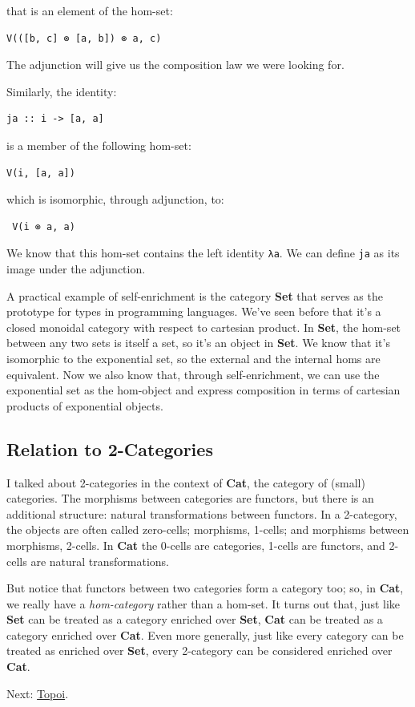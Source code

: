 that is an element of the hom-set:

\begin{verbatim}
V(([b, c] ⊗ [a, b]) ⊗ a, c)
\end{verbatim}

The adjunction will give us the composition law we were looking for.

Similarly, the identity:

\begin{verbatim}
ja :: i -> [a, a]
\end{verbatim}

is a member of the following hom-set:

\begin{verbatim}
V(i, [a, a])
\end{verbatim}

which is isomorphic, through adjunction, to:

\begin{verbatim}
 V(i ⊗ a, a)
\end{verbatim}

We know that this hom-set contains the left identity \texttt{λa}. We can
define \texttt{ja} as its image under the adjunction.

A practical example of self-enrichment is the category \textbf{Set} that
serves as the prototype for types in programming languages. We've seen
before that it's a closed monoidal category with respect to cartesian
product. In \textbf{Set}, the hom-set between any two sets is itself a
set, so it's an object in \textbf{Set}. We know that it's isomorphic to
the exponential set, so the external and the internal homs are
equivalent. Now we also know that, through self-enrichment, we can use
the exponential set as the hom-object and express composition in terms
of cartesian products of exponential objects.

\subsection{Relation to 2-Categories}\label{relation-to-2-categories}

I talked about 2-categories in the context of \textbf{Cat}, the category
of (small) categories. The morphisms between categories are functors,
but there is an additional structure: natural transformations between
functors. In a 2-category, the objects are often called zero-cells;
morphisms, 1-cells; and morphisms between morphisms, 2-cells. In
\textbf{Cat} the 0-cells are categories, 1-cells are functors, and
2-cells are natural transformations.

But notice that functors between two categories form a category too; so,
in \textbf{Cat}, we really have a \emph{hom-category} rather than a
hom-set. It turns out that, just like \textbf{Set} can be treated as a
category enriched over \textbf{Set}, \textbf{Cat} can be treated as a
category enriched over \textbf{Cat}. Even more generally, just like
every category can be treated as enriched over \textbf{Set}, every
2-category can be considered enriched over \textbf{Cat}.

Next: \href{https://bartoszmilewski.com/2017/07/22/topoi/}{Topoi}.
